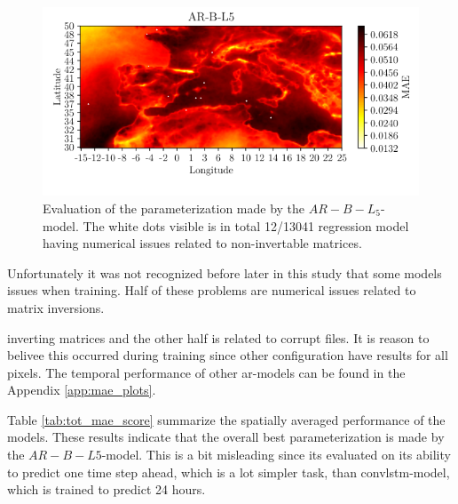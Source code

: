 \begin{figure}[ht]
    \centering
    \includegraphics{python_figs/mea_best_ar_model_tcc_L5_in_folder_AR-B-L5.png}
    \caption{Evaluation of the parameterization made by the $AR-B-L_5$-model. The white dots visible is in total 12/13041 regression model having numerical issues related to non-invertable matrices.}
    \label{fig:MAE_AR}
\end{figure}


Unfortunately it was not recognized before later in this study that 
some models issues when training. Half of these problems are numerical issues related to matrix inversions.

inverting matrices and the other half is related to corrupt files. It is reason to belivee this occurred during training since other configuration have results for all pixels. The temporal performance of other \acrshort{ar}-models can be found in the Appendix \ref{app:mae_plots}.

Table \ref{tab:tot_mae_score} summarize the spatially averaged performance of the models. These results indicate that the overall best parameterization is made by the $AR-B-L5$-model. This is a bit misleading since its evaluated on its ability to predict one time step ahead, which is a lot simpler task, than \acrshort{convlstm}-model, which is trained to predict 24 hours. 


